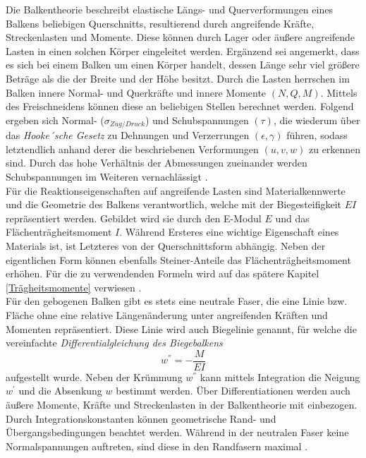 \noindent Die Balkentheorie beschreibt elastische Längs- und Querverformungen eines Balkens beliebigen Querschnitts, resultierend durch angreifende Kräfte, Streckenlasten und Momente. Diese können durch Lager oder äußere angreifende Lasten in einen solchen Körper eingeleitet werden. Ergänzend sei angemerkt, dass es sich bei einem Balken um einen Körper handelt, dessen Länge sehr viel größere Beträge als die der Breite und der Höhe besitzt. Durch die Lasten herrschen im Balken innere Normal- und Querkräfte und innere Momente $(N, Q, M)$. Mittels des Freischneidens können diese an beliebigen Stellen berechnet werden. Folgend ergeben sich Normal- ($\sigma_{Zug/Druck}$) und Schubspannungen $(\tau)$, die wiederum über das \textit{Hooke´sche Gesetz} zu Dehnungen und Verzerrungen $(\epsilon, \gamma)$ führen, sodass letztendlich anhand derer die beschriebenen Verformungen $(u, v, w)$ zu erkennen sind. Durch das hohe Verhältnis der Abmessungen zueinander werden Schubspannungen im Weiteren vernachlässigt \cite{item15}\cite{item16}\cite{item9}. \\

\noindent Für die Reaktionseigenschaften auf angreifende Lasten sind Materialkennwerte und die Geometrie des Balkens verantwortlich, welche mit der Biegesteifigkeit $EI$ repräsentiert werden. Gebildet wird sie durch den E-Modul $E$ und das Flächenträgheitsmoment $I$. Während Ersteres eine wichtige Eigenschaft eines Materials ist, ist Letzteres von der Querschnittsform abhängig. Neben der eigentlichen Form können ebenfalls Steiner-Anteile das Flächenträgheitsmoment erhöhen. Für die zu verwendenden Formeln wird auf das spätere Kapitel \ref{Trägheitsmomente} verwiesen \cite{item16}.\\


\noindent Für den gebogenen Balken gibt es stets eine neutrale Faser, die eine Linie bzw. Fläche ohne eine relative Längenänderung unter angreifenden Kräften und Momenten repräsentiert. Diese Linie wird auch Biegelinie genannt, für welche die vereinfachte \textit{Differentialgleichung des Biegebalkens}
\begin{equation}
	w^{''}=-\frac{M}{EI}
\end{equation}
aufgestellt wurde. Neben der Krümmung $w^{''}$ kann mittels Integration die Neigung $w^{'}$ und die Absenkung $w$ bestimmt werden. Über Differentiationen werden auch äußere Momente, Kräfte und Streckenlasten in der Balkentheorie mit einbezogen. Durch Integrationskonstanten können geometrische Rand- und Übergangsbedingungen beachtet werden. Während in der neutralen Faser keine Normalspannungen auftreten, sind diese in den Randfasern maximal \cite{item16}\cite{item9}.\\


